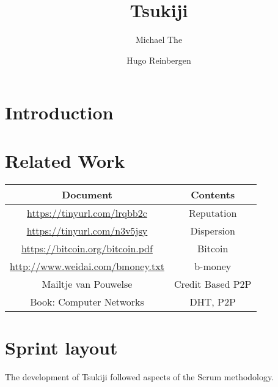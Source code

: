 \documentclass[]{article}
\title{Tsukiji}
\author{Michael The \and Hugo Reinbergen}
\begin{document}
\maketitle

\begin{abstract}

\end{abstract}

\section{Introduction}
\section{Related Work}
\begin{tabular}{|c|c|}
 \hline
 Document & Contents  \\
 \hline
 \url{https://tinyurl.com/lrqbb2c} & Reputation \\
 \url{https://tinyurl.com/n3v5jsy} & Dispersion \\
 \url{https://bitcoin.org/bitcoin.pdf} & Bitcoin \\
 \url{http://www.weidai.com/bmoney.txt} & b-money \\
 Mailtje van Pouwelse & Credit Based P2P \\
 Book: Computer Networks & DHT, P2P \\
 \hline
\end{tabular} 
\section{Sprint layout}
The development of Tsukiji followed aspects of the Scrum methodology.
\end{document}
